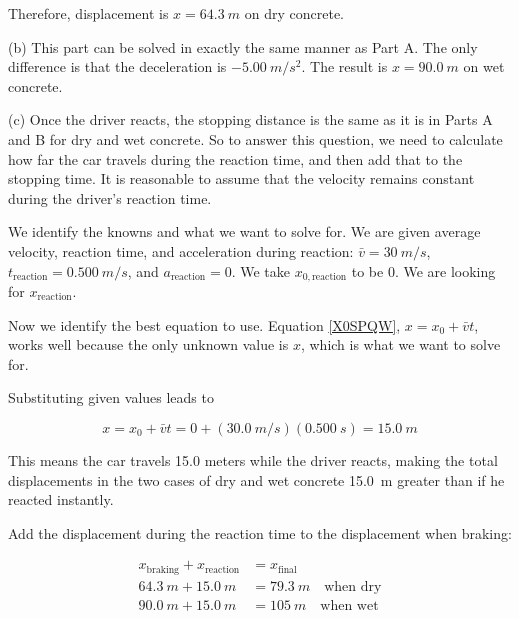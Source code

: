 \documentclass[../../main-ap-physics.tex]{subfiles}
\begin{document}
Therefore, displacement is $x = \SI{64.3}{m}$ on dry concrete.

\vspace{1em}

(b) This part can be solved in exactly the same manner as Part A. The only difference is that the deceleration is $-\SI{5.00}{m/s^2}$. The result is $x = \SI{90.0}{m}$ on wet concrete.

\vspace{1em}

(c) Once the driver reacts, the stopping distance is the same as it is in Parts A and B for dry and wet concrete. So to answer this question, we need to calculate how far the car travels during the reaction time, and then add that to the stopping time. It is reasonable to assume that the velocity remains constant during the driver’s reaction time.

\vspace{1em}

We identify the knowns and what we want to solve for. We are given average velocity, reaction time, and acceleration during reaction: $\bar{v} = \SI{30}{m/s}$, $t_{\text{reaction}} = \SI{0.500}{m/s}$, and $a_{\text{reaction}} = 0$.  We take $x_{0,\text{reaction}}$ to be 0. We are looking for $x_{\text{reaction}}$. 

\vspace{1em} 

Now we identify the best equation to use. Equation \eqref{X0SPQW}, $x = x_0 + \bar{v} t$, works well because the only unknown value is $x$, which is what we want to solve for. 

\vspace{1em}

Substituting given values leads to 

\begin{equation*}
    x = x_0 + \bar{v} t = 0 + \left(\SI{30.0}{m/s}\right) \left(\SI{0.500}{s}\right) = \SI{15.0}{m}
\end{equation*}

This means the car travels 15.0 meters while the driver reacts, making the total displacements in the two cases of dry and wet concrete \SI{15.0}{m} greater than if he reacted instantly.

\vspace{1em}

Add the displacement during the reaction time to the displacement when braking:

\begin{align*}
    x_{\text{braking}} + x_{\text{reaction}} &= x_{\text{final}}\\[1ex]
    \SI{64.3}{m} + \SI{15.0}{m} &= \SI{79.3}{m} \quad \text{when dry}\\
    \SI{90.0}{m} + \SI{15.0}{m} &= \SI{105}{m} \quad \text{when wet}
\end{align*}
\end{document}
